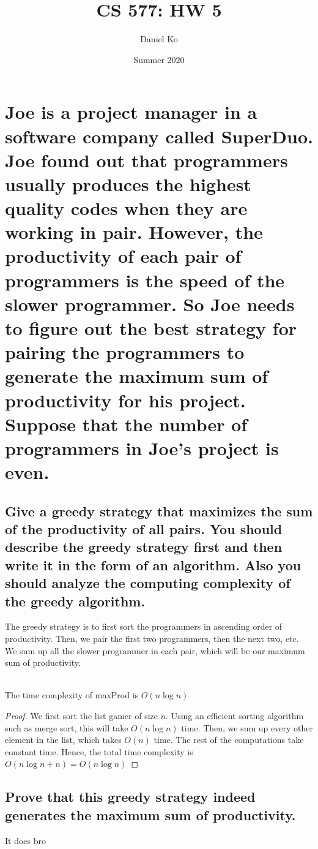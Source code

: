 \documentclass[11pt]{scrartcl}
\title{CS 577: HW 5}
\author{Daniel Ko}
\date{Summer 2020}
\begin{document}
\maketitle

\section{
	Joe is a project manager in a software company called SuperDuo. Joe found out that
	programmers usually produces the highest quality codes when they are working in pair.
	However, the productivity of each pair of programmers is the speed of the slower
	programmer. So Joe needs to figure out the best strategy for pairing the programmers to
	generate the maximum sum of productivity for his project. Suppose that the number of
	programmers in Joe’s project is even.
}

\subsection{
	Give a greedy strategy that maximizes the sum of the productivity of all
	pairs. You should describe the greedy strategy first and then write it in the form of an
	algorithm. Also you should analyze the computing complexity of the greedy
	algorithm.
}
The greedy strategy is to first sort the programmers in ascending order of productivity.
Then, we pair the first two programmers, then the next two, etc. We sum up all the 
slower programmer in each pair, which will be our maximum sum of productivity.  
\begin{algorithm}
\end{algorithm}\\
The time complexity of maxProd is $O(n\log n)$
\begin{proof}
	We first sort the list gamer of size $n$. Using an efficient sorting algorithm such as 
	merge sort, this will take $O(n\log n)$ time. Then, we sum up every other element 
	in the list, which takes $O(n)$ time. The rest of the computations take constant time.
	Hence, the total time complexity is $O(n\log n + n) = O(n\log n)$
\end{proof}
\subsection{
	Prove that this greedy strategy indeed generates the maximum sum of
	productivity.
}
It does bro
\end{document}
